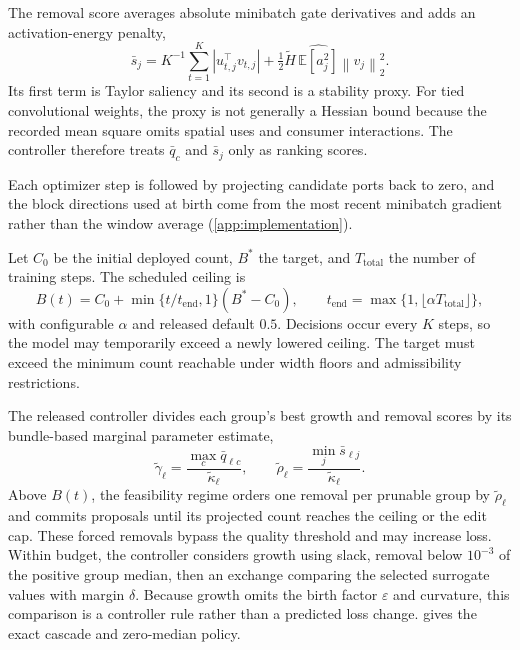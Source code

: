 \documentclass[10pt]{article}
\theoremstyle{paper}
\newcommand{\E}{\mathbb E}
\newcommand{\norm}[1]{\left\lVert #1\right\rVert}
\begin{document}
The removal score averages absolute minibatch gate derivatives and adds an activation-energy penalty,
\begin{equation}
\bar s_j=K^{-1}\sum_{t=1}^K|u_{t,j}^\top v_{t,j}|
+\tfrac12\widetilde H\,\widehat{\E[a_j^2]}\norm{v_j}_2^2.
\label{eq:implemented-removal-score}
\end{equation}
Its first term is Taylor saliency and its second is a stability proxy. For tied convolutional weights, the proxy is not generally a Hessian bound because the recorded mean square omits spatial uses and consumer interactions. The controller therefore treats $\bar q_c$ and $\bar s_j$ only as ranking scores.

Each optimizer step is followed by projecting candidate ports back to zero, and the block directions used at birth come from the most recent minibatch gradient rather than the window average (\cref{app:implementation}).

Let $C_0$ be the initial deployed count, $B^*$ the target, and $T_{\mathrm{total}}$ the number of training steps. The scheduled ceiling is
\begin{equation}
B(t)=C_0+\min\{t/t_{\mathrm{end}},1\}(B^*-C_0),
\qquad t_{\mathrm{end}}=\max\{1,\lfloor\alpha T_{\mathrm{total}}\rfloor\},
\label{eq:main-budget-schedule}
\end{equation}
with configurable $\alpha$ and released default $0.5$. Decisions occur every $K$ steps, so the model may temporarily exceed a newly lowered ceiling. The target must exceed the minimum count reachable under width floors and admissibility restrictions.

The released controller divides each group's best growth and removal scores by its bundle-based marginal parameter estimate,
\begin{equation}
\widetilde\gamma_\ell=\frac{\max_c\bar q_{\ell c}}{\widetilde\kappa_\ell},
\qquad
\widetilde\rho_\ell=\frac{\min_j\bar s_{\ell j}}{\widetilde\kappa_\ell}.
\label{eq:main-practical-densities}
\end{equation}
Above $B(t)$, the feasibility regime orders one removal per prunable group by $\widetilde\rho_\ell$ and commits proposals until its projected count reaches the ceiling or the edit cap. These forced removals bypass the quality threshold and may increase loss. Within budget, the controller considers growth using slack, removal below $10^{-3}$ of the positive group median, then an exchange comparing the selected surrogate values with margin $\delta$. Because growth omits the birth factor $\varepsilon$ and curvature, this comparison is a controller rule rather than a predicted loss change.  gives the exact cascade and zero-median policy.
\end{document}
